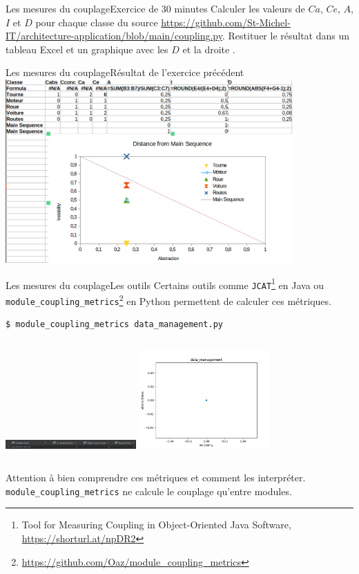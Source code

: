 \documentclass{beamer}
\begin{document}
    \begin{frame}{Les mesures du couplage}{Exercice \execcounterdispinc{} de 30 minutes}
        Calculer les valeurs de $Ca$, $Ce$, $A$, $I$ et $D$ pour chaque classe du source \url{https://github.com/St-Michel-IT/architecture-application/blob/main/coupling.py}.
        \bigbreak
        Restituer le résultat dans un tableau Excel et un graphique avec les $D$ et la droite .
    \end{frame}

    \begin{frame}{Les mesures du couplage}{Résultat de l'exercice précédent}
        \centering
        \includegraphics[width=11cm]{image/exercice-metrics-1}
    \end{frame}

    \begin{frame}[fragile]{Les mesures du couplage}{Les outils}
        Certains outils comme \lstinline{JCAT}\footnote{Tool for Measuring Coupling in Object-Oriented Java Software, \url{https://shorturl.at/npDR2}} en Java ou \lstinline{module_coupling_metrics}\footnote{\url{https://github.com/Oaz/module_coupling_metrics}} en Python permettent de calculer ces métriques.
        \begin{lstlisting}[language=bash]
$ module_coupling_metrics data_management.py
        \end{lstlisting}
        \begin{columns}
            \centering
            \includegraphics[width=5cm]{image/data-management-metrics-table}
            \centering
            \includegraphics[width=5cm]{image/data-management-disance-chart}
        \end{columns}

        Attention à bien comprendre ces métriques et comment les interpréter.
        \lstinline{module_coupling_metrics} ne calcule le couplage qu'entre modules.
        \bigbreak
    \end{frame}
\end{document}
